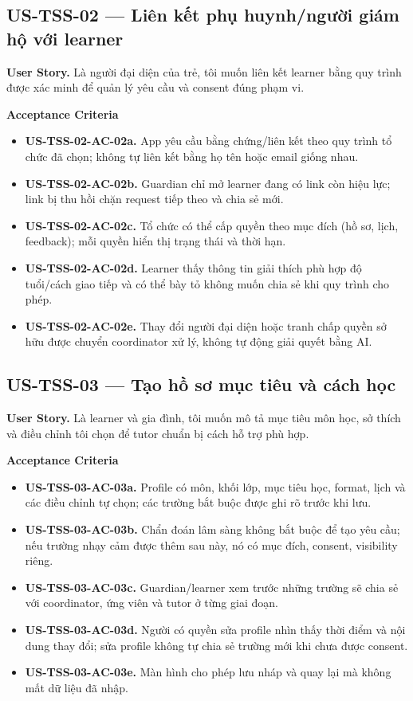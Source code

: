 \documentclass[11pt,a4paper]{article}
\newcommand{\ac}[1]{\textbf{\currentstory-AC-#1.}}
\newcommand{\storytitle}[2]{\subsection{#1 — #2}\def\currentstory{#1}}
\newcommand{\story}[1]{\textbf{User Story.} #1\par}
\newcommand{\acceptance}{\textbf{Acceptance Criteria}\par}
\begin{document}
\storytitle{US-TSS-02}{Liên kết phụ huynh/người giám hộ với learner}
\story{Là người đại diện của trẻ, tôi muốn liên kết learner bằng quy trình được xác minh để quản lý yêu cầu và consent đúng phạm vi.}
\acceptance
\begin{itemize}
  \item \ac{02a} App yêu cầu bằng chứng/liên kết theo quy trình tổ chức đã chọn; không tự liên kết bằng họ tên hoặc email giống nhau.
  \item \ac{02b} Guardian chỉ mở learner đang có link còn hiệu lực; link bị thu hồi chặn request tiếp theo và chia sẻ mới.
  \item \ac{02c} Tổ chức có thể cấp quyền theo mục đích (hồ sơ, lịch, feedback); mỗi quyền hiển thị trạng thái và thời hạn.
  \item \ac{02d} Learner thấy thông tin giải thích phù hợp độ tuổi/cách giao tiếp và có thể bày tỏ không muốn chia sẻ khi quy trình cho phép.
  \item \ac{02e} Thay đổi người đại diện hoặc tranh chấp quyền sở hữu được chuyển coordinator xử lý, không tự động giải quyết bằng AI.
\end{itemize}

\storytitle{US-TSS-03}{Tạo hồ sơ mục tiêu và cách học}
\story{Là learner và gia đình, tôi muốn mô tả mục tiêu môn học, sở thích và điều chỉnh tôi chọn để tutor chuẩn bị cách hỗ trợ phù hợp.}
\acceptance
\begin{itemize}
  \item \ac{03a} Profile có môn, khối lớp, mục tiêu học, format, lịch và các điều chỉnh tự chọn; các trường bắt buộc được ghi rõ trước khi lưu.
  \item \ac{03b} Chẩn đoán lâm sàng không bắt buộc để tạo yêu cầu; nếu trường nhạy cảm được thêm sau này, nó có mục đích, consent, visibility riêng.
  \item \ac{03c} Guardian/learner xem trước những trường sẽ chia sẻ với coordinator, ứng viên và tutor ở từng giai đoạn.
  \item \ac{03d} Người có quyền sửa profile nhìn thấy thời điểm và nội dung thay đổi; sửa profile không tự chia sẻ trường mới khi chưa được consent.
  \item \ac{03e} Màn hình cho phép lưu nháp và quay lại mà không mất dữ liệu đã nhập.
\end{itemize}
\end{document}
